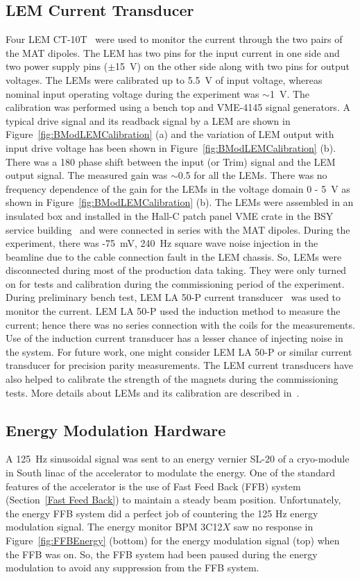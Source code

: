 \subsection{LEM Current Transducer}
\label{LEM Current Transducer}
Four LEM CT-10T~\cite{LEM_CT-10T} were used to monitor the current through the two pairs of the MAT dipoles. 
The LEM has two pins for the input current in one side and two power supply pins ($\pm$15~V) on the other side along with two pins for output voltages. The LEMs were calibrated up to 5.5~V of input voltage, whereas nominal input operating voltage during the experiment was $\sim$1~V. The calibration was performed using a bench top and VME-4145 signal generators. A typical drive signal and its readback signal by a LEM are shown in Figure~\ref{fig:BModLEMCalibration} (a) and the variation of LEM output with input drive voltage has been shown in Figure~\ref{fig:BModLEMCalibration} (b). There was a 180\degrees{} phase shift between the input (or Trim) signal and the LEM output signal. The measured gain was $\sim$0.5 for all the LEMs. There was no frequency dependence of the gain for the LEMs in the voltage domain 0 - 5~V as shown in Figure~\ref{fig:BModLEMCalibration} (b). The LEMs were assembled in an insulated box and installed in the Hall-C patch panel VME crate in the BSY service building~\cite{philip_communication} and were connected in series with the MAT dipoles. During the experiment, there was -75~mV, 240~Hz square wave noise injection in the beamline due to the cable connection fault in the LEM chassis. So, LEMs were disconnected during most of the production data taking. They were only turned on for tests and calibration during the commissioning period of the experiment. During preliminary bench test, LEM LA 50-P current transducer~\cite{LEM_LA_55-P} was used to monitor the current. LEM LA 50-P used the induction method to measure the current; hence there was no series connection with the coils for the measurements. Use of the induction current transducer has a lesser chance of injecting noise in the system. For future work, one might consider LEM LA 50-P or similar current transducer for precision parity measurements. The LEM current transducers have also helped to calibrate the strength of the magnets during the commissioning tests. More details about LEMs and its calibration are described in~\cite{nur_bm_lem}.

\subsection{Energy Modulation Hardware}
\label{Energy Modulation Hardware}
A 125~Hz sinusoidal signal was sent to an energy vernier SL-20 of a cryo-module in South linac of the accelerator to modulate the energy.
One of the standard features of the accelerator is the use of Fast Feed Back (FFB) system (Section~\ref{Fast Feed Back}) to maintain a steady beam position. 
Unfortunately, the energy FFB system did a perfect job of countering the 125 Hz energy modulation signal. 
The energy monitor BPM 3C12$X$ saw no response in Figure~\ref{fig:FFBEnergy} (bottom) for the energy modulation signal (top) when the FFB was on. 
So, the FFB system had been paused during the energy modulation to avoid any suppression from the FFB system. 


